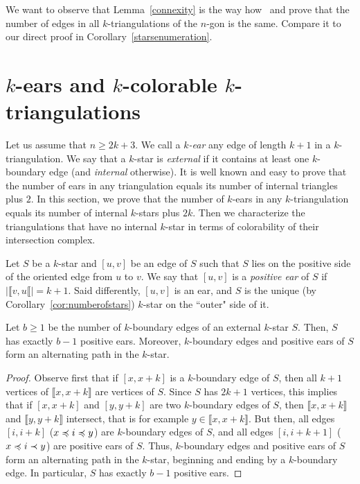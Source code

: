 \documentclass[12pt]{amsart}
\begin{document}
We want to observe that Lemma~\ref{connexity} is the way how~\cite{n-gdfcp-00} and \cite{dkm-lahp-02} prove that the number of edges in all $k$-triangulations of the $n$-gon is the same. Compare it to our direct proof in Corollary~\ref{starsenumeration}.





\section{$k$-ears and $k$-colorable $k$-triangulations}\label{sectionears}


Let us assume that $n\ge 2k+3$. We call a \emph{$k$-ear} any edge of length $k+1$ in a $k$-triangulation. We say that a $k$-star is \emph{external} if it contains at least one $k$-boundary edge (and \emph{internal} otherwise).
It is well known and easy to prove that the number of ears in any triangulation equals its number of internal triangles plus $2$. In this section, we prove that the number of $k$-ears in any $k$-triangulation equals its number of internal $k$-stars plus $2k$. Then we characterize the triangulations that have no internal $k$-star in terms of colorability of their intersection complex.

Let $S$ be a $k$-star and $[u,v]$ be an edge of $S$ such that $S$ lies on the positive side of the oriented edge from $u$ to $v$. We say that $[u,v]$ is a \emph{positive ear} of $S$ if $|\llbracket v,u\llbracket|=k+1$. Said differently, $[u,v]$ is an ear, and $S$ is the unique (by Corollary~\ref{cor:numberofstars}) $k$-star on the ``outer" side of it.

\begin{lemma}\label{starwithboundary}
Let $b\ge 1$ be the number of $k$-boundary edges of an external $k$-star $S$. Then, $S$ has exactly $b-1$ positive ears. Moreover, $k$-boundary edges and positive ears of $S$ form an alternating path in the $k$-star.
\end{lemma}

\begin{proof}
Observe first that if $[x,x+k]$ is a $k$-boundary edge of $S$, then all $k+1$ vertices of $\llbracket x,x+k\rrbracket$ are vertices of $S$. Since $S$ has $2k+1$ vertices, this implies that if $[x,x+k]$ and $[y,y+k]$ are two $k$-boundary edges of $S$, then $\llbracket x,x+k\rrbracket$ and $\llbracket y,y+k\rrbracket$ intersect, that is for example $y\in \llbracket x,x+k\rrbracket$. But then, all edges $[i,i+k]$ ($x\preccurlyeq i\preccurlyeq y$) are $k$-boundary edges of $S$, and all edges $[i,i+k+1]$ ($x\preccurlyeq i\prec y$) are positive ears of $S$. Thus, $k$-boundary edges and positive ears of $S$ form an alternating path in the $k$-star, beginning and ending by a $k$-boundary edge. In particular, $S$ has exactly $b-1$ positive ears.
\end{proof}
\end{document}
